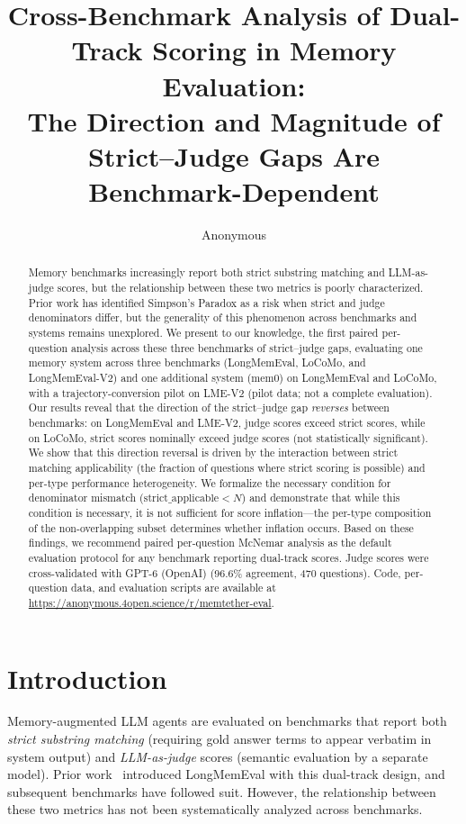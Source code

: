 \documentclass{article}
\title{Cross-Benchmark Analysis of Dual-Track Scoring in Memory Evaluation:\\The Direction and Magnitude of Strict--Judge Gaps Are Benchmark-Dependent}
\author{Anonymous}
\date{}
\begin{document}
\maketitle

\begin{abstract}
Memory benchmarks increasingly report both strict substring matching and LLM-as-judge scores, but the relationship between these two metrics is poorly characterized. Prior work has identified Simpson's Paradox as a risk when strict and judge denominators differ, but the generality of this phenomenon across benchmarks and systems remains unexplored. We present to our knowledge, the first paired per-question analysis across these three benchmarks of strict--judge gaps, evaluating one memory system across three benchmarks (LongMemEval, LoCoMo, and LongMemEval-V2) and one additional system (mem0) on LongMemEval and LoCoMo, with a trajectory-conversion pilot on LME-V2 (pilot data; not a complete evaluation). Our results reveal that the direction of the strict--judge gap \emph{reverses} between benchmarks: on LongMemEval and LME-V2, judge scores exceed strict scores, while on LoCoMo, strict scores nominally exceed judge scores (not statistically significant). We show that this direction reversal is driven by the interaction between strict matching applicability (the fraction of questions where strict scoring is possible) and per-type performance heterogeneity. We formalize the necessary condition for denominator mismatch ($\text{strict\_applicable} < N$) and demonstrate that while this condition is necessary, it is not sufficient for score inflation---the per-type composition of the non-overlapping subset determines whether inflation occurs. Based on these findings, we recommend paired per-question McNemar analysis as the default evaluation protocol for any benchmark reporting dual-track scores. Judge scores were cross-validated with GPT-6 (OpenAI) (96.6\% agreement, 470 questions). Code, per-question data, and evaluation scripts are available at \url{https://anonymous.4open.science/r/memtether-eval}.
\end{abstract}

\section{Introduction}
Memory-augmented LLM agents are evaluated on benchmarks that report both \emph{strict substring matching} (requiring gold answer terms to appear verbatim in system output) and \emph{LLM-as-judge} scores (semantic evaluation by a separate model). Prior work~\citep{wu2024longmemeval} introduced LongMemEval with this dual-track design, and subsequent benchmarks have followed suit. However, the relationship between these two metrics has not been systematically analyzed across benchmarks.
\end{document}
